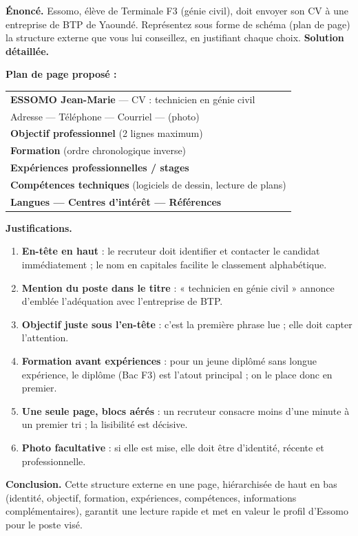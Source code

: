 \documentclass[11pt]{article}
\begin{document}
\begin{exoresolu}
\textbf{Énoncé.} Essomo, élève de Terminale F3 (génie civil), doit envoyer son CV à une entreprise de BTP de Yaoundé. Représentez sous forme de schéma (plan de page) la structure externe que vous lui conseillez, en justifiant chaque choix.
\tcblower
\textbf{Solution détaillée.}

\textbf{Plan de page proposé :}

\begin{center}
\begin{tabularx}{\linewidth}{|X|}
\hline
\rowcolor{popblueL} \textbf{ESSOMO Jean-Marie} — CV : technicien en génie civil \\
Adresse — Téléphone — Courriel — (photo) \\
\hline
\textbf{Objectif professionnel} (2 lignes maximum) \\
\hline
\textbf{Formation} (ordre chronologique inverse) \\
\hline
\textbf{Expériences professionnelles / stages} \\
\hline
\textbf{Compétences techniques} (logiciels de dessin, lecture de plans) \\
\hline
\textbf{Langues — Centres d'intérêt — Références} \\
\hline
\end{tabularx}
\end{center}

\textbf{Justifications.}
\begin{enumerate}
\item \textbf{En-tête en haut} : le recruteur doit identifier et contacter le candidat immédiatement ; le nom en capitales facilite le classement alphabétique.
\item \textbf{Mention du poste dans le titre} : « technicien en génie civil » annonce d'emblée l'adéquation avec l'entreprise de BTP.
\item \textbf{Objectif juste sous l'en-tête} : c'est la première phrase lue ; elle doit capter l'attention.
\item \textbf{Formation avant expériences} : pour un jeune diplômé sans longue expérience, le diplôme (Bac F3) est l'atout principal ; on le place donc en premier.
\item \textbf{Une seule page, blocs aérés} : un recruteur consacre moins d'une minute à un premier tri ; la lisibilité est décisive.
\item \textbf{Photo facultative} : si elle est mise, elle doit être d'identité, récente et professionnelle.
\end{enumerate}

\textbf{Conclusion.} Cette structure externe en une page, hiérarchisée de haut en bas (identité, objectif, formation, expériences, compétences, informations complémentaires), garantit une lecture rapide et met en valeur le profil d'Essomo pour le poste visé.
\end{exoresolu}
\end{document}
